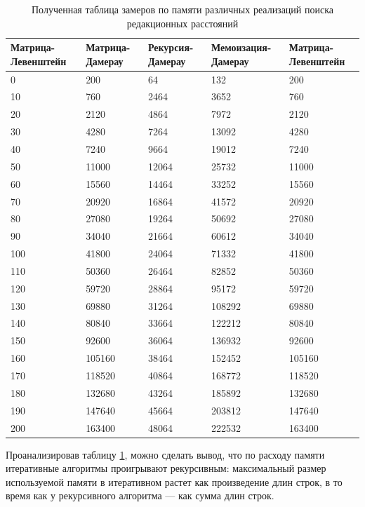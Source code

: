 \begin{table}[!ht]
    \centering
    \tiny
    \caption{Полученная таблица замеров по памяти различных реализаций поиска редакционных расстояний}
    \label{t:memory}
    \begin{tabular}{|l|l|l|l|l|}
    \hline
        Матрица-Левенштейн & Матрица-Дамерау & Рекурсия-Дамерау & Мемоизация-Дамерау & Матрица-Левенштейн \\ \hline
        0 & 200 & 64 & 132 & 200 \\ \hline
        10 & 760 & 2464 & 3652 & 760 \\ \hline
        20 & 2120 & 4864 & 7972 & 2120 \\ \hline
        30 & 4280 & 7264 & 13092 & 4280 \\ \hline
        40 & 7240 & 9664 & 19012 & 7240 \\ \hline
        50 & 11000 & 12064 & 25732 & 11000 \\ \hline
        60 & 15560 & 14464 & 33252 & 15560 \\ \hline
        70 & 20920 & 16864 & 41572 & 20920 \\ \hline
        80 & 27080 & 19264 & 50692 & 27080 \\ \hline
        90 & 34040 & 21664 & 60612 & 34040 \\ \hline
        100 & 41800 & 24064 & 71332 & 41800 \\ \hline
        110 & 50360 & 26464 & 82852 & 50360 \\ \hline
        120 & 59720 & 28864 & 95172 & 59720 \\ \hline
        130 & 69880 & 31264 & 108292 & 69880 \\ \hline
        140 & 80840 & 33664 & 122212 & 80840 \\ \hline
        150 & 92600 & 36064 & 136932 & 92600 \\ \hline
        160 & 105160 & 38464 & 152452 & 105160 \\ \hline
        170 & 118520 & 40864 & 168772 & 118520 \\ \hline
        180 & 132680 & 43264 & 185892 & 132680 \\ \hline
        190 & 147640 & 45664 & 203812 & 147640 \\ \hline
        200 & 163400 & 48064 & 222532 & 163400 \\ \hline
    \end{tabular}
\end{table}

Проанализировав таблицу \ref{t:memory}, можно сделать вывод, что по расходу памяти итеративные алгоритмы 
проигрывают рекурсивным: максимальный размер используемой памяти в итеративном растет как произведение длин строк,
в то время как у рекурсивного алгоритма — как сумма длин строк.

